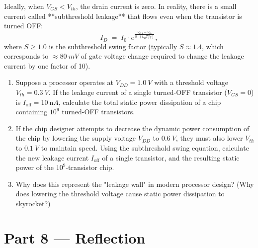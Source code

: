 \documentclass[12pt, a4paper]{book}
\begin{document}
\begin{deepbox}
\begin{enumerate}[label=\textbf{D\arabic*.}]
        Ideally, when $V_{GS} < V_{th}$, the drain current is zero. In reality, there is a small current called **subthreshold leakage** that flows even when the transistor is turned OFF:
        \[
          I_D \;=\; I_{0} \cdot e^{\frac{V_{GS} - V_{th}}{S \cdot (k_B T / q)}},
        \]
        where $S \ge 1.0$ is the subthreshold swing factor (typically $S \approx 1.4$, which corresponds to $\approx \SI{80}{mV}$ of gate voltage change required to change the leakage current by one factor of 10).
        \begin{enumerate}[label=(\alph*)]
          \item Suppose a processor operates at $V_{DD} = \SI{1.0}{V}$ with a threshold voltage $V_{th} = \SI{0.3}{V}$.
                If the leakage current of a single turned-OFF transistor ($V_{GS} = 0$) is $I_{\text{off}} = \SI{10}{\nano A}$, calculate the total static power dissipation of a chip containing $10^9$ turned-OFF transistors.
          \item If the chip designer attempts to decrease the dynamic power consumption of the chip by lowering the supply voltage $V_{DD}$ to $\SI{0.6}{V}$, they must also lower $V_{th}$ to $\SI{0.1}{V}$ to maintain speed.
                Using the subthreshold swing equation, calculate the new leakage current $I_{\text{off}}$ of a single transistor, and the resulting static power of the $10^9$-transistor chip.
          \item Why does this represent the "leakage wall" in modern processor design? (Why does lowering the threshold voltage cause static power dissipation to skyrocket?)
        \end{enumerate}
\end{enumerate}
\end{deepbox}

\newpage

\section{Part 8 --- Reflection}
\end{document}
